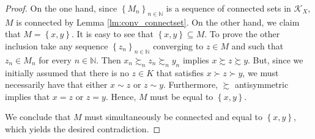 \documentclass[12pt, oneside]{amsart}
\theoremstyle{definition}
\begin{document}
\begin{proof}
On the one hand, since $\left\{M_n\right\}_{n \in \mathbb{N}}$ is a sequence of connected sets in $\mathcal{K}_X$, $M$ is connected by Lemma \ref{lm:conv_connectset}. On the other hand, we claim that $M = \left\{x, y\right\}$. It is easy to see that $\left\{x, y\right\} \subseteq M$. To prove the other inclusion take any sequence $\left\{z_n\right\}_{n \in \mathbb{N}}$ converging to $z \in M$ and such that $z_n \in M_n$ for every $n \in \mathbb{N}$. Then $x_n \succsim_n z_n \succsim_n y_n$ implies $x \succsim z \succsim y$. But, since we initially assumed that there is no $z \in K$ that satisfies $x \succ z \succ y$, we must necessarily have that either $x \sim z$ or $z \sim y$. Furthermore, $\succsim$ antisymmetric implies that $x=z$ or $z=y$. Hence, $M$ must be equal to $\left\{x, y\right\}$.
		
We conclude that $M$ must simultaneously be connected and equal to $\left\{x, y\right\}$, which yields the desired contradiction.
\end{proof}
	



\end{document}
